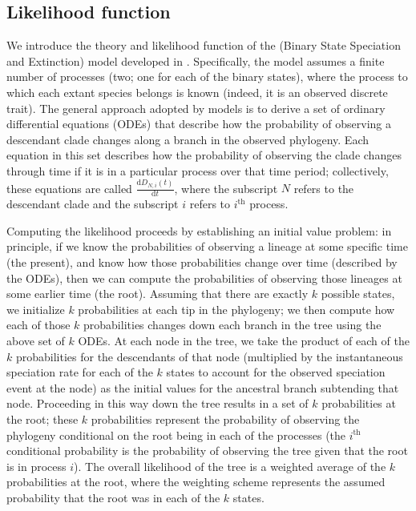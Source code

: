 \subsection{Likelihood function}\label{section:likelihood}
	We introduce the theory and likelihood function of the \BiSSE (Binary State Speciation and Extinction) model developed in \cite{Maddison2007}.
	Specifically, the \BiSSE model assumes a finite number of processes (two; one for each of the binary states), where the process to which each extant species belongs is known (indeed, it is an observed discrete trait).
	The general approach adopted by \BiSSE models is to derive a set of ordinary differential equations (ODEs) that describe how the probability of observing a descendant clade changes along a branch in the observed phylogeny.
	Each equation in this set describes how the probability of observing the clade changes through time if it is in a particular process over that time period; collectively, these equations are called $\frac{ \mathrm{d}D_{N,i}(t)}{\mathrm{d}t}$, where the subscript $N$ refers to the descendant clade and the subscript $i$ refers to $i^\text{th}$ process.

	Computing the likelihood proceeds by establishing an initial value problem: in principle, if we know the probabilities of observing a lineage at some specific time (\EG the present), and know how those probabilities change over time (described by the ODEs), then we can compute the probabilities of observing those lineages at some earlier time (\EG the root).
	Assuming that there are exactly $k$ possible states, we initialize $k$ probabilities at each tip in the phylogeny; we then compute how each of those $k$ probabilities changes down each branch in the tree using the above set of $k$ ODEs.
	At each node in the tree, we take the product of each of the $k$ probabilities for the descendants of that node (multiplied by the instantaneous speciation rate for each of the $k$ states to account for the observed speciation event at the node) as the initial values for the ancestral branch subtending that node.
	Proceeding in this way down the tree results in a set of $k$ probabilities at the root; these $k$ probabilities represent the probability of observing the phylogeny conditional on the root being in each of the processes (\IE the $i^\text{th}$ conditional probability is the probability of observing the tree given that the root is in process $i$).
	The overall likelihood of the tree is a weighted average of the $k$ probabilities at the root, where the weighting scheme represents the assumed probability that the root was in each of the $k$ states.

